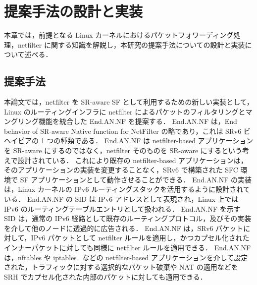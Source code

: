 \chapter{提案手法の設計と実装}
\label{chap:design_and_impl}
本章では，前提となる Linux カーネルにおけるパケットフォワーディング処理，netfilter に関する知識を解説し，本研究の提案手法についての設計と実装について述べる．

\section{提案手法}
\label{section:proposal-method}
本論文では，netfilter を SR-aware SF として利用するための新しい実装として，Linux のルーティングインフラに netfilter によるパケットのフィルタリングとマングリング機能を統合した End.AN.NF を提案する．
End.AN.NF は，End behavior of SR-aware Native function for NetFilter の略であり，これは SRv6 ビヘイビアの 1 つの種類である．
End.AN.NF は netfilter-based アプリケーションを SR-aware にするのではなく，netfilter そのものを SR-aware にするという考えで設計されている．
これにより既存の netfilter-based アプリケーションは，そのアプリケーションの実装を変更することなく，SRv6 で構築された SFC 環境で SF アプリケーションとして動作させることができる．
End.AN.NF の実装は，Linux カーネルの IPv6 ルーティングスタックを活用するように設計されている．
End.AN.NF の SID は IPv6 アドレスとして表現され，Linux 上では IPv6 のルーティングテーブルエントリとして扱われる．
End.AN.NF を示す SID は，通常の IPv6 経路として既存のルーティングプロトコル，及びその実装を介して他のノードに透過的に広告される．
End.AN.NF は，SRv6 パケットに対して，IPv6 パケットとして netfilter ルールを適用し，かつカプセル化されたインナーパケットに対しても同様に netfilter ルールを適用できる．
End.AN.NF は，nftables\cite{nftables} や iptables~\cite{iptables} などの netfilter-based アプリケーションを介して設定された，トラフィックに対する選択的なパケット破棄や NAT の適用などを SRH でカプセル化された内部のパケットに対しても適用できる．

